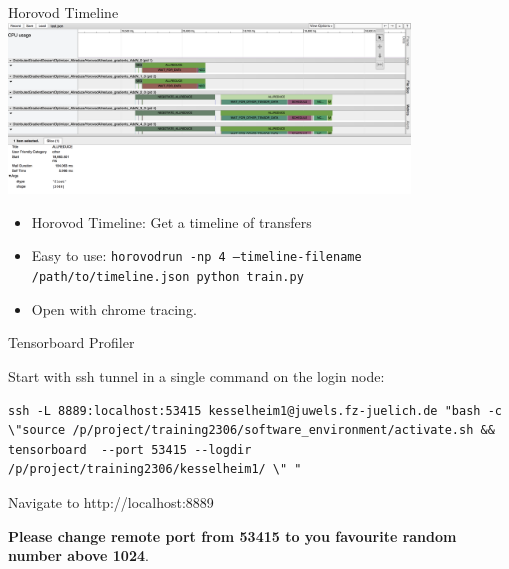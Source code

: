 \documentclass[t, 10pt, aspectratio=1610]{beamer}
\begin{document}
\begin{frame}{Horovod Timeline}
    \includegraphics[width=0.8\textwidth]{horovod_timeline.png}
    \begin{itemize}
        \item Horovod Timeline: Get a timeline 
    of transfers
        \item Easy to use: \texttt{horovodrun -np 4 --timeline-filename /path/to/timeline.json python train.py}
        \item Open with chrome tracing.
    \end{itemize}
\end{frame}


\begin{frame}[fragile]{Tensorboard Profiler}



Start with ssh tunnel in a single command on the login node:
\begin{lstlisting}
ssh -L 8889:localhost:53415 kesselheim1@juwels.fz-juelich.de "bash -c \"source /p/project/training2306/software_environment/activate.sh && tensorboard  --port 53415 --logdir /p/project/training2306/kesselheim1/ \" "
\end{lstlisting}
Navigate to http://localhost:8889

\textbf{Please change remote port from 53415 to you favourite random number above 1024}.

\end{frame}
\end{document}
